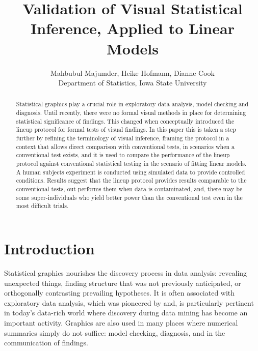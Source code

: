 \documentclass{article}
\begin{document}
\title{Validation of Visual Statistical Inference, Applied to Linear Models}
\author{Mahbubul Majumder, Heike Hofmann, Dianne Cook\\
        Department of Statistics, Iowa State University}
\maketitle

\begin {abstract}  
Statistical graphics play a crucial role in exploratory data analysis, model checking and diagnosis. Until recently, there were no formal visual methods in place for determining statistical significance of findings. This changed when \citet{buja:2009} conceptually introduced the lineup protocol for formal tests of visual findings. In this paper this is taken a step further by refining the terminology of visual inference, framing the protocol in a context that allows direct comparison with conventional tests, in scenarios when a conventional test exists, and it is used to compare the performance of the lineup protocol against conventional statistical testing in the scenario of fitting linear models. A human subjects experiment is conducted using simulated data to provide controlled conditions. Results suggest that the lineup protocol provides results comparable to the conventional tests, out-performs them when data is contaminated, and, there may be some super-individuals who yield better power than the conventional test even in the most difficult trials.
\end {abstract}


\section{Introduction} 


Statistical graphics nourishes the discovery process in data analysis: revealing unexpected things,  finding structure that was not previously anticipated,  or orthogonally contrasting prevailing hypotheses. It is often associated with exploratory data analysis, which was pioneered by \cite{tukey:eda} and, is particularly pertinent in today's data-rich world where discovery during data mining has become an important activity. Graphics are also used in many places where numerical summaries simply do not suffice: model checking, diagnosis, and in the communication of findings. 
\end{document}
